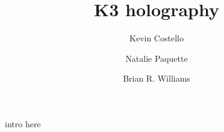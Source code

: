 \documentclass[11pt]{amsart}
\title{K3 holography}
\author{Kevin Costello}
\author{Natalie Paquette}
\author{Brian R. Williams}
\begin{document}
\maketitle

\begin{abstract} %
\end{abstract}

\tableofcontents

intro here













\end{document}
